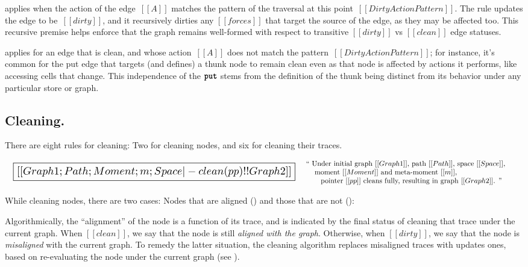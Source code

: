 \documentclass[11pt]{article}
\renewcommand{\ottkw}[1]{\textbf{\texttt{#1}}}
\begin{document}
 applies when the action of the edge~$[[A]]$
matches the pattern of the traversal at this
point~$[[DirtyActionPattern]]$.
%
The rule updates the edge to be~$[[dirty]]$, and it recursively
dirties any $[[forces]]$ that target the source of the edge, as they
may be affected too.
%
This recursive premise helps enforce that the graph remains
well-formed with respect to transitive $[[dirty]]$ vs $[[clean]]$ edge statuses.

 applies for an edge that is clean, and whose
action~$[[A]]$ does not match the pattern~$[[DirtyActionPattern]]$;
for instance, it's common for the put edge that targets (and defines)
a thunk node to remain clean even as that node is affected by actions
it performs, like accessing cells that change.
%
This independence of the $\ottkw{put}$ stems from the definition of the
thunk being distinct from its behavior under any particular store or
graph.

\subsection{Cleaning.}

There are eight rules for cleaning: Two for cleaning nodes, and six for cleaning their traces.

\[
\begin{array}{lc}
  {\scalebox{1.5}{
  \boxed{[[Graph1; Path; Moment; m; Space |- clean(pp) !! Graph2]]}}}
&
\begin{array}{p{4in}}
  ``
  Under initial graph~$[[Graph1]]$,
  path~$[[Path]]$,
  space~$[[Space]]$,\\
  \hspace{3mm}~moment~$[[Moment]]$ and meta-moment~$[[m]]$,\\
  \hspace{6mm}~pointer~$[[pp]]$ cleans fully,
  resulting in graph~$[[Graph2]]$.
  ''
\end{array}
\end{array}
\]

While cleaning nodes, there are two cases: Nodes that are aligned
() and those that are not ():

\begin{mathpar}
\end{mathpar}

Algorithmically, the ``alignment'' of the node is a function of its trace, and is indicated by the final status of cleaning that trace under the current graph.
%
When $[[clean]]$, we say that the node is still \emph{aligned with the graph}.
Otherwise, when $[[dirty]]$, we say that the node is \emph{misaligned} with the current graph.
%
To remedy the latter situation, the cleaning algorithm replaces misaligned traces with updates ones,
based on re-evaluating the node under the current graph (see ).
%
\end{document}
